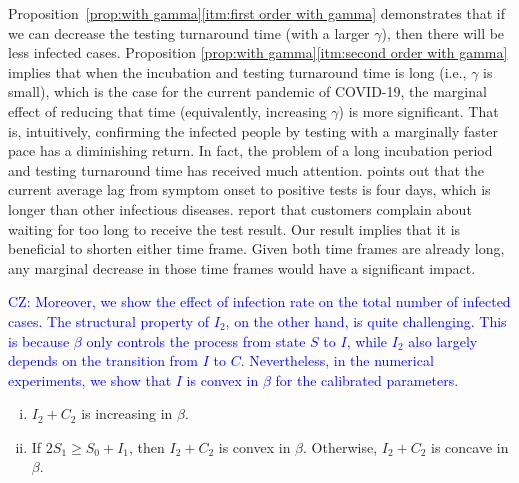 \documentclass[nonblindrev, copyedit]{informs3a}
\newcommand\cz[1]{\textcolor{blue}{CZ: #1}}
\newcounter{prop}[chapter]
\begin{document}
Proposition~\ref{prop:with gamma}\eqref{itm:first order with gamma} demonstrates that if we can decrease the testing turnaround time (with a larger $\gamma$), then there will be less infected cases.
Proposition \ref{prop:with gamma}\eqref{itm:second order with gamma} implies that when the incubation and testing turnaround time is long (i.e., $\gamma$ is small), which is the case for the current pandemic of COVID-19, the marginal effect of reducing that time (equivalently, increasing $\gamma$) is more significant.
That is, intuitively, confirming the infected people by testing with a marginally faster pace has a diminishing return.
In fact, the problem of a long incubation period and testing turnaround time has received much attention.
\citet{popovich2020how} points out that the current average lag from symptom onset to positive tests is four days, which is longer than other infectious diseases.
\citet{Abbott2020CVS} report that customers complain about waiting for too long to receive the test result.
Our result implies that it is beneficial to shorten either time frame. Given both time frames are already long, any marginal decrease in those time frames would have a significant impact.

\cz{Moreover, we show the effect of infection rate on the total number of infected cases. 
The structural property of $I_2$, on the other hand, is quite challenging.
This is because $\beta$ only controls the process from state $S$ to $I$, while $I_2$ also largely depends on  the transition from $I$ to $C$.
Nevertheless, in the numerical experiments, we show that $I$ is convex in $\beta$ for the calibrated parameters.}

\begin{proposition}
\label{prop:with beta}
    \begin{enumerate}[(i)]
    \item\label{itm:first order with beta} $I_2+C_2$ is increasing in $\beta$.
    \item\label{itm:second order with beta} If $2S_1\ge S_0+I_1$, then $I_2+C_2$ is convex in $\beta$. Otherwise, $I_2+C_2$ is concave in $\beta$.
   \end{enumerate}
\end{proposition}
\end{document}
